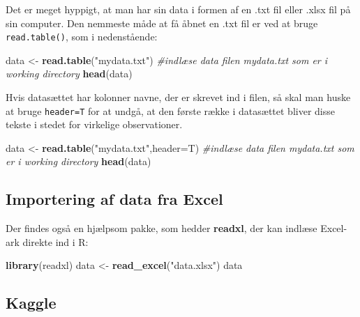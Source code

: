 \documentclass[
]{book}
\newenvironment{Shaded}{\begin{snugshade}}{\end{snugshade}}
\newcommand{\AttributeTok}[1]{\textcolor[rgb]{0.27,0.27,0.27}{#1}}
\newcommand{\CommentTok}[1]{\textcolor[rgb]{0.37,0.37,0.37}{\textit{#1}}}
\newcommand{\FunctionTok}[1]{\textcolor[rgb]{0.27,0.27,0.27}{\textbf{#1}}}
\newcommand{\NormalTok}[1]{#1}
\newcommand{\OtherTok}[1]{\textcolor[rgb]{0.37,0.37,0.37}{#1}}
\newcommand{\StringTok}[1]{\textcolor[rgb]{0.5,0.5,0.5}{#1}}
\begin{document}
Det er meget hyppigt, at man har sin data i formen af en .txt fil eller .xlsx fil på sin computer. Den nemmeste måde at få åbnet en .txt fil er ved at bruge \texttt{read.table()}, som i nedenstående:

\begin{Shaded}
\begin{Highlighting}[]
\NormalTok{data }\OtherTok{\textless{}{-}} \FunctionTok{read.table}\NormalTok{(}\StringTok{"mydata.txt"}\NormalTok{) }\CommentTok{\#indlæse data filen mydata.txt som er i working directory}
\FunctionTok{head}\NormalTok{(data)}
\end{Highlighting}
\end{Shaded}

Hvis datasættet har kolonner navne, der er skrevet ind i filen, så skal man huske at bruge \texttt{header=T} for at undgå, at den første række i datasættet bliver disse tekste i stedet for virkelige observationer.

\begin{Shaded}
\begin{Highlighting}[]
\NormalTok{data }\OtherTok{\textless{}{-}} \FunctionTok{read.table}\NormalTok{(}\StringTok{"mydata.txt"}\NormalTok{,}\AttributeTok{header=}\NormalTok{T) }\CommentTok{\#indlæse data filen mydata.txt som er i working directory}
\FunctionTok{head}\NormalTok{(data)}
\end{Highlighting}
\end{Shaded}

\subsection{Importering af data fra Excel}\label{importering-af-data-fra-excel}

Der findes også en hjælpsom pakke, som hedder \textbf{readxl}, der kan indlæse Excel-ark direkte ind i R:

\begin{Shaded}
\begin{Highlighting}[]
\FunctionTok{library}\NormalTok{(readxl)}
\NormalTok{data }\OtherTok{\textless{}{-}} \FunctionTok{read\_excel}\NormalTok{(}\StringTok{"data.xlsx"}\NormalTok{)}
\NormalTok{data}
\end{Highlighting}
\end{Shaded}

\subsection{Kaggle}\label{kaggle}
\end{document}
